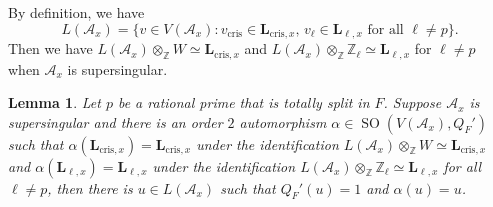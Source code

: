 \documentclass{amsart}
\numberwithin{equation}{subsection}
\numberwithin{theorem}{section}
\newtheorem{lemma}[theorem]{Lemma}
\theoremstyle{definition}
\theoremstyle{remark}
\newcommand{\bZ}{\mathbb{Z}}
\newcommand{\cA}{\mathcal{A}}
\newcommand{\cris}{_{\mathrm{cris}}}
\DeclareMathOperator{\SO}{SO}
\begin{document}
By definition, we have \begin{equation}
    L(\cA_x) = \{v\in V(\cA_x): v\cris \in \bm{L}_{\mathrm{cris}, x}, \, v_\ell\in \bm{L}_{\ell,x} \text{ for all }\ell\neq p\}. 
\end{equation} Then we have $L(\cA_x) \otimes_\bZ W \simeq \bm{L}_{\mathrm{cris},x}$ and $L(\cA_x) \otimes_{\bZ} \bZ_\ell \simeq \bm{L}_{\ell,x}$ for $\ell\neq p$ when $\cA_x$ is supersingular. 


\begin{lemma} \label{lem:auto}
    Let $p$ be a rational prime that is totally split in $F$.
    Suppose $\cA_x$ is supersingular and there is an order $2$ automorphism $\alpha\in \SO (V(\cA_x), Q_F')$ such that $\alpha(\bm{L}_{\mathrm{cris},x}) = \bm{L}_{\mathrm{cris}, x}$ under the identification $L(\cA_x) \otimes_{\bZ}W\simeq \bm{L}_{\mathrm{cris},x}$ and $\alpha (\bm{L}_{\ell,x}) = \bm{L}_{\ell,x}$ under the identification $L(\cA_x)\otimes_{\bZ}\bZ_\ell \simeq \bm{L}_{\ell,x}$ for all $\ell\neq p$, then there is $u\in L(\cA_x)$ such that $Q_F'(u) = 1$ and $\alpha(u) = u$.
\end{lemma}
\end{document}
